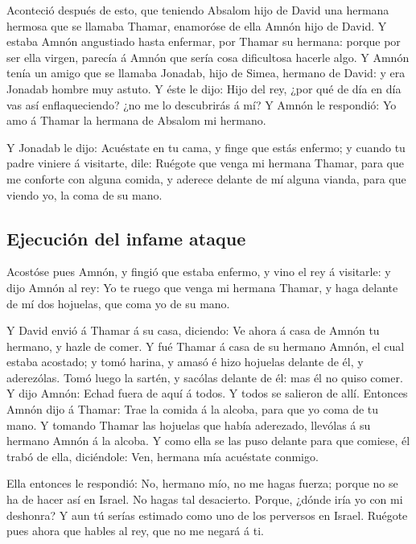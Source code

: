 Aconteció después de esto, que teniendo Absalom hijo de
David una hermana hermosa que se llamaba Thamar, enamoróse de ella Amnón
hijo de David.  Y estaba Amnón angustiado hasta enfermar,
por Thamar su hermana: porque por ser ella virgen, parecía á Amnón que
sería cosa dificultosa hacerle algo.  Y Amnón tenía un amigo
que se llamaba Jonadab, hijo de Simea, hermano de David: y era Jonadab
hombre muy astuto.  Y éste le dijo: Hijo del rey, ¿por qué
de día en día vas así enflaqueciendo? ¿no me lo descubrirás á mí? Y
Amnón le respondió: Yo amo á Thamar la hermana de Absalom mi hermano.

 Y Jonadab le dijo: Acuéstate en tu cama, y finge que estás
enfermo; y cuando tu padre viniere á visitarte, dile: Ruégote que venga
mi hermana Thamar, para que me conforte con alguna comida, y aderece
delante de mí alguna vianda, para que viendo yo, la coma de su mano.

\hypertarget{ejecuciuxf3n-del-infame-ataque}{%
\subsection{Ejecución del infame
ataque}\label{ejecuciuxf3n-del-infame-ataque}}

 Acostóse pues Amnón, y fingió que estaba enfermo, y vino el
rey á visitarle: y dijo Amnón al rey: Yo te ruego que venga mi hermana
Thamar, y haga delante de mí dos hojuelas, que coma yo de su mano.

 Y David envió á Thamar á su casa, diciendo: Ve ahora á casa
de Amnón tu hermano, y hazle de comer.  Y fué Thamar á casa
de su hermano Amnón, el cual estaba acostado; y tomó harina, y amasó é
hizo hojuelas delante de él, y aderezólas.  Tomó luego la
sartén, y sacólas delante de él: mas él no quiso comer. Y dijo Amnón:
Echad fuera de aquí á todos. Y todos se salieron de allí. 
Entonces Amnón dijo á Thamar: Trae la comida á la alcoba, para que yo
coma de tu mano. Y tomando Thamar las hojuelas que había aderezado,
llevólas á su hermano Amnón á la alcoba.  Y como ella se
las puso delante para que comiese, él trabó de ella, diciéndole: Ven,
hermana mía acuéstate conmigo.

 Ella entonces le respondió: No, hermano mío, no me hagas
fuerza; porque no se ha de hacer así en Israel. No hagas tal desacierto.
 Porque, ¿dónde iría yo con mi deshonra? Y aun tú serías
estimado como uno de los perversos en Israel. Ruégote pues ahora que
hables al rey, que no me negará á ti.

